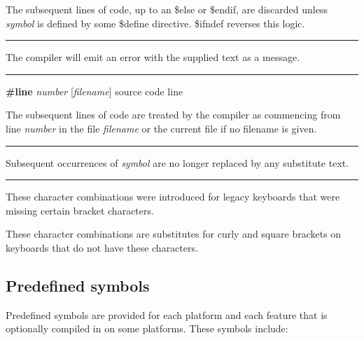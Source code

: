 The subsequent lines of code, up to an \$else or \$endif, are discarded
unless \textit{symbol} is defined by some \$define directive. \$ifndef
reverses this logic.

\bigskip\hrule\vspace{0.1cm}

\noindent
{}The compiler will emit an error with the
supplied text as a message.


\bigskip\hrule\vspace{0.1cm}
{\textbf{\#line} \textit{number}
[\textit{filename}] \hfill source code line}

\noindent
The subsequent lines of code are treated by the compiler as commencing
from line \textit{number} in the file \textit{filename} or the current
file if no filename is given.

\bigskip\hrule\vspace{0.1cm}

\noindent
{}Subsequent occurrences of \textit{symbol} are no longer
replaced by any substitute text.

\bigskip\hrule\vspace{0.1cm}

\noindent
These character combinations were introduced for legacy keyboards that
were missing certain bracket characters.


These character combinations are substitutes for curly and square
brackets on keyboards that do not have these characters.

\subsection*{Predefined symbols}

Predefined symbols are provided for each
platform and each feature that is optionally compiled in on some
platforms. These symbols include:

